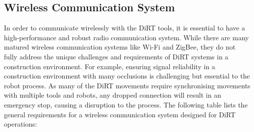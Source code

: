 \subsection{Wireless Communication System}

In order to communicate wirelessly with the DiRT tools, it is essential to have a high-performance and robust radio communication system. While there are many matured wireless communication systems like Wi-Fi and ZigBee, they do not fully address the unique challenges and requirements of DiRT systems in a construction environment. For example, ensuring signal reliability in a construction environment with many occlusions is challenging but essential to the robot process. As many of the DiRT movements require synchronising movements with multiple tools and robots, any dropped connection will result in an emergency stop, causing a disruption to the process. The following table lists the general requirements for a wireless communication system designed for DiRT operations:

